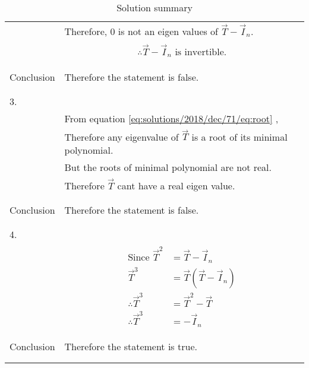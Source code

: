 \begin{longtable}{|l|l|}
&Therefore, 0 is not an eigen values of  $\vec{T}-\vec{I}_{n}$.\\
&\parbox{6cm}{\begin{align}
    \therefore\vec{T}-\vec{I}_{n}\mbox{ is invertible.}
\end{align}}\\
&\\
\hline
&\\
Conclusion&Therefore the statement is false.\\
&\\
\hline
\pagebreak
\hline
&\\
3.&\\
& From equation \eqref{eq:solutions/2018/dec/71/eq:root} ,\\
&Therefore any eigenvalue of $\vec{T}$ is a root of its minimal polynomial.\\
&But the roots of minimal polynomial are not real.\\
&Therefore $\vec{T}$ cant have a real eigen value.\\
&\\
\hline
&\\
Conclusion&Therefore the statement is false.\\
&\\
\hline
&\\
4.&\\
&\parbox{6cm}{\begin{align}
    \mbox{Since }\vec{T}^2&=\vec{T}-\vec{I}_{n}\\
    \vec{T}^3&=\vec{T}(\vec{T}-\vec{I}_{n})\\
    \therefore\vec{T}^3&=\vec{T}^2-\vec{T}\\
    \therefore \vec{T}^3&=-\vec{I}_{n}\label{eq:solutions/2018/dec/71/eq:T_cube}
\end{align}}\\
&\\
\hline
&\\
Conclusion&Therefore the statement is true.\\
&\\
\hline
\caption{Solution summary}
\label{eq:solutions/2018/dec/71/table:2}
\end{longtable}
\twocolumn
